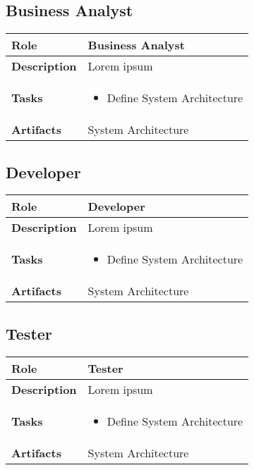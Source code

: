 \subsection{Business Analyst}
 \label{table:ch6_Role_Business_Analysist}
\begin{tabular}
	{|m{2cm}|m{10cm}|} \hline \bfseries Role & Business Analyst\\
	\hline \bfseries Description & Lorem ipsum\\
	\hline \bfseries Tasks & 
	\begin{itemize}
		\item Define System Architecture 
	\end{itemize}
	\\
	\hline \bfseries Artifacts & System Architecture\\
	\hline 
\end{tabular}

\subsection{Developer}
 \label{table:ch6_Role_Developer}
\begin{tabular}
	{|m{2cm}|m{10cm}|} \hline \bfseries Role & Developer\\
	\hline \bfseries Description & Lorem ipsum\\
	\hline \bfseries Tasks & 
	\begin{itemize}
		\item Define System Architecture 
	\end{itemize}
	\\
	\hline \bfseries Artifacts & System Architecture\\
	\hline 
\end{tabular}

\subsection{Tester}
 \label{table:ch6_Role_Tester}
\begin{tabular}
	{|m{2cm}|m{10cm}|} \hline \bfseries Role & Tester\\
	\hline \bfseries Description & Lorem ipsum\\
	\hline \bfseries Tasks & 
	\begin{itemize}
		\item Define System Architecture 
	\end{itemize}
	\\
	\hline \bfseries Artifacts & System Architecture\\
	\hline
\end{tabular}

